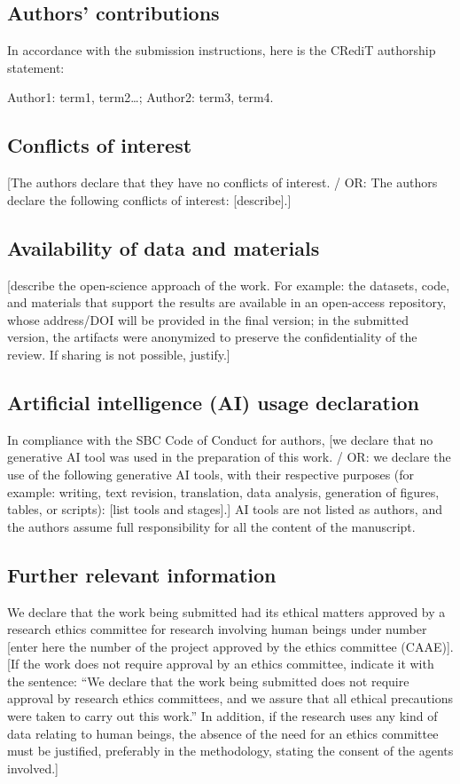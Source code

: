 \documentclass[11pt,a4paper,english]{article}
\begin{document}
\subsection*{Authors' contributions}
In accordance with the submission instructions, here is the CRediT authorship statement:

Author1: term1, term2\ldots; Author2: term3, term4.

\subsection*{Conflicts of interest}
[The authors declare that they have no conflicts of interest. / OR: The authors declare the following conflicts of interest: [describe].]

\subsection*{Availability of data and materials}
[describe the open-science approach of the work. For example: the datasets, code, and materials that support the results are available in an open-access repository, whose address/DOI will be provided in the final version; in the submitted version, the artifacts were anonymized to preserve the confidentiality of the review. If sharing is not possible, justify.]

\subsection*{Artificial intelligence (AI) usage declaration}
In compliance with the SBC Code of Conduct for authors, [we declare that no generative AI tool was used in the preparation of this work. / OR: we declare the use of the following generative AI tools, with their respective purposes (for example: writing, text revision, translation, data analysis, generation of figures, tables, or scripts): [list tools and stages].] AI tools are not listed as authors, and the authors assume full responsibility for all the content of the manuscript.

\subsection*{Further relevant information}
We declare that the work being submitted had its ethical matters approved by a research ethics committee for research involving human beings under number [enter here the number of the project approved by the ethics committee (CAAE)]. [If the work does not require approval by an ethics committee, indicate it with the sentence: ``We declare that the work being submitted does not require approval by research ethics committees, and we assure that all ethical precautions were taken to carry out this work.'' In addition, if the research uses any kind of data relating to human beings, the absence of the need for an ethics committee must be justified, preferably in the methodology, stating the consent of the agents involved.]
\end{document}
